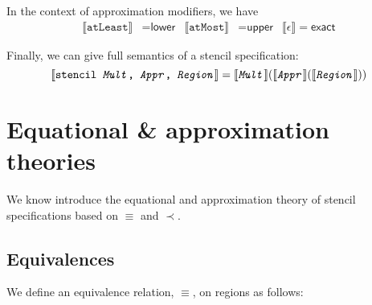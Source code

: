 \documentclass{article}
\theoremstyle{definition}
\theoremstyle{plain}
\newcommand{\interp}[1]{\llbracket#1\rrbracket}
\newcommand{\textcap}[1]{\texttt{\textit{#1}}}
\begin{document}
In the context of approximation modifiers, we have
%
\begin{align*}
  \interp{\texttt{atLeast}} & = \textsf{lower} &
  \interp{\texttt{atMost}} & = \textsf{upper} &
  \llbracket \epsilon \rrbracket = \textsf{exact}
\end{align*}

Finally, we can give full semantics of a stencil specification:
%
\begin{equation*}
  \interp{\texttt{stencil \textcap{Mult}, \textcap{Appr}, \textcap{Region}}} =
    \interp{\textcap{Mult}}
           {(\interp{\textcap{Appr}}
                    {(\interp{\textcap{Region}})})}
\end{equation*}

\section{Equational \& approximation theories}

We know introduce the equational and approximation theory of stencil
specifications based on $\equiv$ and $\prec$.

\subsection{Equivalences}

We define an equivalence relation, $\equiv$, on regions as follows:
\end{document}
